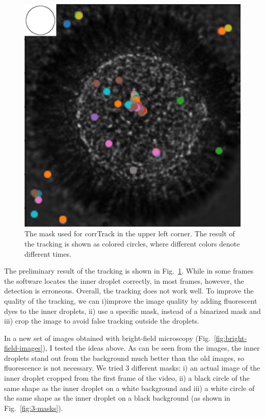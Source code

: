 \documentclass[onecolumn,aps, pre,amsmath,amssymb,longbibliography,12pt]{revtex4-2}
\begin{document}
\begin{figure}[h]
  \includegraphics{mask-and-result}
  \caption{The mask used for corrTrack in the upper left corner.
  The result of the tracking is shown as colored circles, where different colors denote different times.}
  \label{fig:mask-and-result}
\end{figure}

The preliminary result of the tracking is shown in Fig.~\ref{fig:mask-and-result}.
While in some frames the software locates the inner droplet correctly, in most frames, however, the detection is erroneous.
Overall, the tracking does not work well.
To improve the quality of the tracking, we can
i)improve the image quality by adding fluorescent dyes to the inner droplets,
ii) use a specific mask, instead of a binarized mask and
iii) crop the image to avoid false tracking outside the droplets.

In a new set of images obtained with bright-field microscopy (Fig.~\ref{fig:bright-field-images}), I tested the ideas above.
As can be seen from the images, the inner droplets stand out from the background much better than the old images, so fluorescence is not necessary.
We tried 3 different masks:
i) an actual image of the inner droplet cropped from the first frame of the video,
ii) a black circle of the same shape as the inner droplet on a white background and
iii) a white circle of the same shape as the inner droplet on a black background (as shown in Fig.~\ref{fig:3-masks}).
\end{document}

